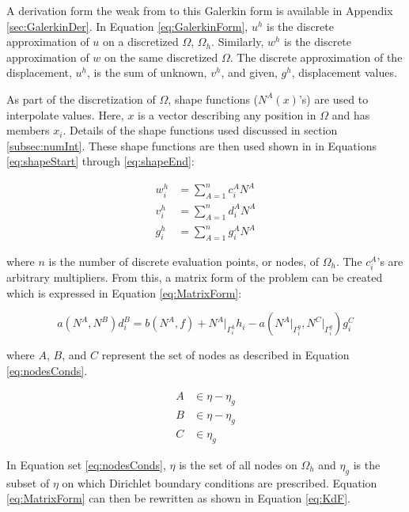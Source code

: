 \documentclass[a4paper, 12pt]{article}
\begin{document}
\noindent
A derivation form the weak from to this Galerkin form 
is available in Appendix \ref{sec:GalerkinDer}.
In Equation \ref{eq:GalerkinForm}, $u^{h}$ is the discrete
approximation of $u$ on a discretized $\Omega$, $\Omega_h$. Similarly,
$w^{h}$ is the discrete approximation of $w$ on the same 
discretized $\Omega$. The discrete approximation of
the displacement, $u^{h}$, is the sum of unknown, $v^{h}$, 
and given, $g^{h}$, displacement values. 

As part of the discretization of $\Omega$, shape functions
($N^{A}(x)$'s) are used to interpolate values. Here, $x$
is a vector describing any position in $\Omega$ and has members $x_i$. 
Details of the shape functions used discussed in section \ref{subsec:numInt}.
These shape functions are then used shown in in Equations
\ref{eq:shapeStart} through \ref{eq:shapeEnd}:

\begin{align}
w^{h}_i &= \sum_{A=1}^{n} c^{A}_i N^{A} 
  \label{eq:shapeStart}                       \\
v^{h}_i &= \sum_{A=1}^{n} d^{A}_i N^{A} 
  \label{eq:shapeUnks}                         \\
g^{h}_i &= \sum_{A=1}^{n} g^{A}_i N^{A} 
  \label{eq:shapeEnd}
\end{align}

\noindent
where $n$ is the number of discrete evaluation points, or nodes,
of $\Omega_h$. The $c^{A}_{i}$'s are arbitrary multipliers. From this, a matrix 
form of the problem can be created which is expressed in 
Equation \ref{eq:MatrixForm}:

\begin{equation} \label{eq:MatrixForm}
a( N^A, N^B) d^{B}_{i} = 
  b( N^A, f) +
  N^A\Big|_{\Gamma_{i}^{h}} h_i -
  a( N^A\Big|_{\Gamma_{i}^{g}} , N^C\Big|_{\Gamma_{i}^{g}} ) g_{i}^C
\end{equation} 

\noindent 
where $A$, $B$, and $C$ represent the set of nodes as described in 
Equation \ref{eq:nodesConds}.

\begin{align}
A &\in \eta - \eta_g
  \nonumber         \\
B &\in \eta - \eta_g
  \nonumber         \\
C &\in \eta_g
  \label{eq:nodesConds}
\end{align}

\noindent
In Equation set \ref{eq:nodesConds}, $\eta$ is the set of all nodes on $\Omega_h$ 
and $\eta_g$ is the subset of $\eta$ on which Dirichlet boundary conditions are 
prescribed. Equation \ref{eq:MatrixForm} can then be rewritten as shown in
Equation \ref{eq:KdF}.
\end{document}
